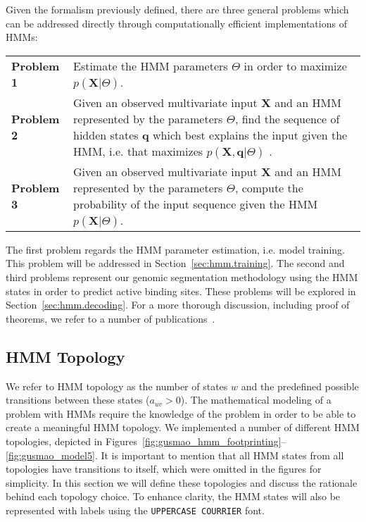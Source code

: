 Given the formalism previously defined, there are three general problems which can be addressed directly through computationally efficient implementations of HMMs:

\begin{center}
  \begin{tabular}{lp{.8\linewidth}}
    {\bf Problem 1} & Estimate the HMM parameters $ \Theta $ in order to maximize $p(\mathbf{X} | \Theta)$. \\[0.2cm]
    {\bf Problem 2} & Given an observed multivariate input $ \mathbf{X} $ and an HMM represented by the parameters $ \Theta $, find the sequence of hidden states $ \mathbf{q} $ which best explains the input given the HMM, i.e. that maximizes $ p\left( \mathbf{X}, \mathbf{q} | \Theta \right) $ . \\[0.2cm]
    {\bf Problem 3} & Given an observed multivariate input $ \mathbf{X} $ and an HMM represented by the parameters $ \Theta $, compute the probability of the input sequence given the HMM $p(\mathbf{X} | \Theta)$. \\[0.2cm]
  \end{tabular}
\end{center}

The first problem regards the HMM parameter estimation, i.e. model training. This problem will be addressed in Section~\ref{sec:hmm.training}. The second and third problems represent our genomic segmentation methodology using the HMM states in order to predict active binding sites. These problems will be explored in Section~\ref{sec:hmm.decoding}. For a more thorough discussion, including proof of theorems, we refer to a number of publications~\cite{rabiner1989,durbin1998,mitchell1997,bishop2006,duda2000}.

\subsection{HMM Topology}
\label{sec:hmm.topology}

We refer to HMM topology as the number of states $w$ and the predefined possible transitions between these states ($a_{uv} > 0$). The mathematical modeling of a problem with HMMs require the knowledge of the problem in order to be able to create a meaningful HMM topology. We implemented a number of different HMM topologies, depicted in Figures~\ref{fig:gusmao_hmm_footprinting}--\ref{fig:gusmao_model5}. It is important to mention that all HMM states from all topologies have transitions to itself, which were omitted in the figures for simplicity. In this section we will define these topologies and discuss the rationale behind each topology choice. To enhance clarity, the HMM states will also be represented with labels using the {\tt UPPERCASE COURRIER} font.

